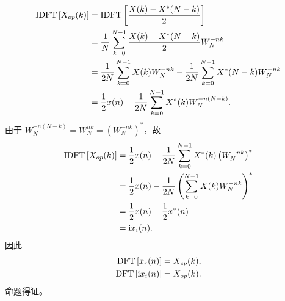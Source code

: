 \begin{solution}
\begin{enumerate}[label=(\arabic*)]
            \begin{align*}
                \mathrm{IDFT}\left[X_{op}(k)\right] & = \mathrm{IDFT}\left[\frac{X(k) - X^*(N - k)}{2}\right] \\
                & = \frac{1}{N}\sum_{k = 0}^{N - 1}\frac{X(k) - X^*(N - k)}{2}W_N^{-nk} \\
                & = \frac{1}{2N}\sum_{k = 0}^{N - 1}X(k)W_N^{-nk} - \frac{1}{2N}\sum_{k = 0}^{N - 1}X^*(N - k)W_N^{-nk} \\
                & = \frac{1}{2}x(n) - \frac{1}{2N}\sum_{k = 0}^{N - 1}X^*(k)W_N^{-n(N - k)}.
            \end{align*}
            由于 $W_N^{-n(N - k)} = W_N^{nk} = \left(W_N^{-nk}\right)^*$，故
            \begin{align*}
                \mathrm{IDFT}\left[X_{op}(k)\right] & = \frac{1}{2}x(n) - \frac{1}{2N}\sum_{k = 0}^{N - 1}X^*(k)\left(W_N^{-nk}\right)^* \\
                & = \frac{1}{2}x(n) - \frac{1}{2N}\left(\sum_{k = 0}^{N - 1}X(k)W_N^{-nk}\right)^* \\
                & = \frac{1}{2}x(n) - \frac{1}{2}x^*(n) \\
                & = \mathrm{i} x_i(n).
            \end{align*}
            因此
            \begin{align*}
                \mathrm{DFT}\left[x_r(n)\right] & = X_{ep}(k), \\
                \mathrm{DFT}\left[\mathrm{i} x_i(n)\right] & = X_{op}(k).
            \end{align*}
            命题得证。
    \end{enumerate}
\end{solution}

